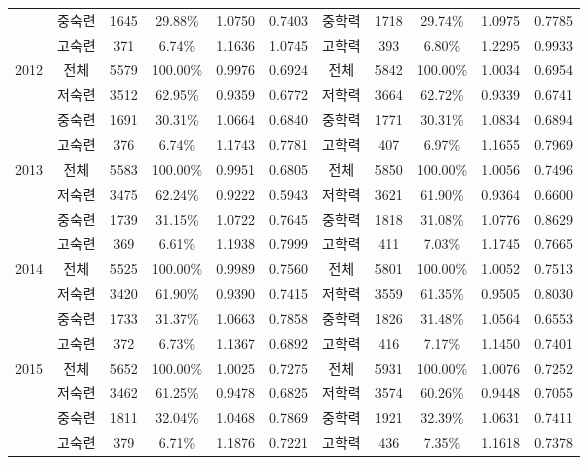 {\begin{longtable}[htbp]{c|ccccc|ccccc}
    & 중숙련   & 1645  & 29.88\% & 1.0750 & 0.7403 & 중학력   & 1718  & 29.74\% & 1.0975 & 0.7785  \\
    & 고숙련   & 371   & 6.74\% & 1.1636 & 1.0745 &  고학력   & 393   & 6.80\% & 1.2295 & 0.9933  \\
    \hline \multirow[t]{4}{*}{2012}  & 전체    & 5579  & 100.00\% & 0.9976 & 0.6924  & 전체    & 5842  & 100.00\% & 1.0034 & 0.6954  \\
    & 저숙련   & 3512  & 62.95\% & 0.9359 & 0.6772 & 저학력   & 3664  & 62.72\% & 0.9339 & 0.6741  \\
    & 중숙련   & 1691  & 30.31\% & 1.0664 & 0.6840 & 중학력   & 1771  & 30.31\% & 1.0834 & 0.6894  \\
    & 고숙련   & 376   & 6.74\% & 1.1743 & 0.7781 & 고학력   & 407   & 6.97\% & 1.1655 & 0.7969  \\
    \hline \multirow[t]{4}{*}{2013}  & 전체    & 5583  & 100.00\% & 0.9951 & 0.6805  & 전체    & 5850  & 100.00\% & 1.0056 & 0.7496  \\
    & 저숙련   & 3475  & 62.24\% & 0.9222 & 0.5943 & 저학력   & 3621  & 61.90\% & 0.9364 & 0.6600  \\
    & 중숙련   & 1739  & 31.15\% & 1.0722 & 0.7645 & 중학력   & 1818  & 31.08\% & 1.0776 & 0.8629  \\
    & 고숙련   & 369   & 6.61\% & 1.1938 & 0.7999 & 고학력   & 411   & 7.03\% & 1.1745 & 0.7665  \\
    \hline \multirow[t]{4}{*}{2014}  & 전체    & 5525  & 100.00\% & 0.9989 & 0.7560  & 전체    & 5801  & 100.00\% & 1.0052 & 0.7513  \\
    & 저숙련   & 3420  & 61.90\% & 0.9390 & 0.7415 & 저학력   & 3559  & 61.35\% & 0.9505 & 0.8030  \\
    & 중숙련   & 1733  & 31.37\% & 1.0663 & 0.7858 & 중학력   & 1826  & 31.48\% & 1.0564 & 0.6553  \\
    & 고숙련   & 372   & 6.73\% & 1.1367 & 0.6892 & 고학력   & 416   & 7.17\% & 1.1450 & 0.7401  \\
    \hline \multirow[t]{4}{*}{2015}  & 전체    & 5652  & 100.00\% & 1.0025 & 0.7275  & 전체    & 5931  & 100.00\% & 1.0076 & 0.7252  \\
    & 저숙련   & 3462  & 61.25\% & 0.9478 & 0.6825 & 저학력   & 3574  & 60.26\% & 0.9448 & 0.7055  \\
    & 중숙련   & 1811  & 32.04\% & 1.0468 & 0.7869 & 중학력   & 1921  & 32.39\% & 1.0631 & 0.7411  \\
    & 고숙련   & 379   & 6.71\% & 1.1876 & 0.7221 & 고학력   & 436   & 7.35\% & 1.1618 & 0.7378  \\

\end{longtable}}
